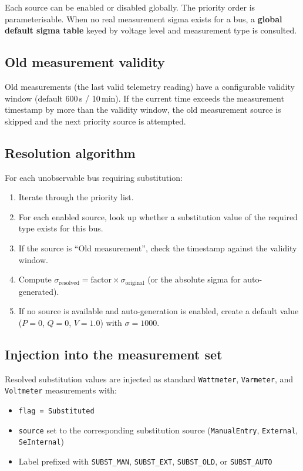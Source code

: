 \documentclass[11pt,a4paper]{article}
\begin{document}
\noindent
Each source can be enabled or disabled globally.  The priority order is
parameterisable.  When no real measurement sigma exists for a bus, a
\textbf{global default sigma table} keyed by voltage level and
measurement type is consulted.

\subsection{Old measurement validity}

Old measurements (the last valid telemetry reading) have a configurable
validity window (default 600\,s / 10\,min).  If the current time exceeds
the measurement timestamp by more than the validity window, the old
measurement source is skipped and the next priority source is attempted.

\subsection{Resolution algorithm}

For each unobservable bus requiring substitution:

\begin{enumerate}
  \item Iterate through the priority list.
  \item For each enabled source, look up whether a substitution value of
        the required type exists for this bus.
  \item If the source is ``Old measurement'', check the timestamp against
        the validity window.
  \item Compute $\sigma_\text{resolved} = \text{factor} \times \sigma_\text{original}$
        (or the absolute sigma for auto-generated).
  \item If no source is available and auto-generation is enabled, create
        a default value ($P{=}0$, $Q{=}0$, $V{=}1.0$) with
        $\sigma = 1000$.
\end{enumerate}

\subsection{Injection into the measurement set}

Resolved substitution values are injected as standard \texttt{Wattmeter},
\texttt{Varmeter}, and \texttt{Voltmeter} measurements with:
\begin{itemize}
  \item \texttt{flag = Substituted}
  \item \texttt{source} set to the corresponding substitution source
        (\texttt{ManualEntry}, \texttt{External}, \texttt{SeInternal})
  \item Label prefixed with \texttt{SUBST\_MAN}, \texttt{SUBST\_EXT},
        \texttt{SUBST\_OLD}, or \texttt{SUBST\_AUTO}
\end{itemize}
\end{document}
